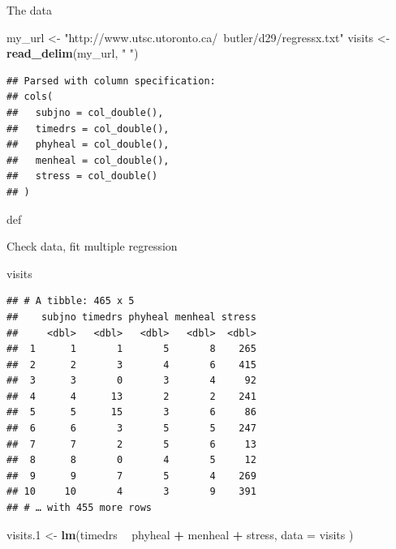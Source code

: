 \documentclass[ignorenonframetext,]{beamer}
\newenvironment{Shaded}{\begin{snugshade}}{\end{snugshade}}
\newcommand{\DataTypeTok}[1]{\textcolor[rgb]{0.13,0.29,0.53}{#1}}
\newcommand{\FloatTok}[1]{\textcolor[rgb]{0.00,0.00,0.81}{#1}}
\newcommand{\KeywordTok}[1]{\textcolor[rgb]{0.13,0.29,0.53}{\textbf{#1}}}
\newcommand{\NormalTok}[1]{#1}
\newcommand{\OperatorTok}[1]{\textcolor[rgb]{0.81,0.36,0.00}{\textbf{#1}}}
\newcommand{\StringTok}[1]{\textcolor[rgb]{0.31,0.60,0.02}{#1}}
\begin{document}
\begin{frame}[fragile]{The data}
\protect\hypertarget{the-data}{}

\begin{Shaded}
\begin{Highlighting}[]
\NormalTok{my_url <-}\StringTok{ "http://www.utsc.utoronto.ca/~butler/d29/regressx.txt"}
\NormalTok{visits <-}\StringTok{ }\KeywordTok{read_delim}\NormalTok{(my_url, }\StringTok{" "}\NormalTok{)}
\end{Highlighting}
\end{Shaded}

\begin{verbatim}
## Parsed with column specification:
## cols(
##   subjno = col_double(),
##   timedrs = col_double(),
##   phyheal = col_double(),
##   menheal = col_double(),
##   stress = col_double()
## )
\end{verbatim}

def

\end{frame}

\begin{frame}[fragile]{Check data, fit multiple regression}
\protect\hypertarget{check-data-fit-multiple-regression}{}

\begin{Shaded}
\begin{Highlighting}[]
\NormalTok{visits}
\end{Highlighting}
\end{Shaded}

\begin{verbatim}
## # A tibble: 465 x 5
##    subjno timedrs phyheal menheal stress
##     <dbl>   <dbl>   <dbl>   <dbl>  <dbl>
##  1      1       1       5       8    265
##  2      2       3       4       6    415
##  3      3       0       3       4     92
##  4      4      13       2       2    241
##  5      5      15       3       6     86
##  6      6       3       5       5    247
##  7      7       2       5       6     13
##  8      8       0       4       5     12
##  9      9       7       5       4    269
## 10     10       4       3       9    391
## # … with 455 more rows
\end{verbatim}

\begin{Shaded}
\begin{Highlighting}[]
\NormalTok{visits}\FloatTok{.1}\NormalTok{ <-}\StringTok{ }\KeywordTok{lm}\NormalTok{(timedrs }\OperatorTok{~}\StringTok{ }\NormalTok{phyheal }\OperatorTok{+}\StringTok{ }\NormalTok{menheal }\OperatorTok{+}\StringTok{ }\NormalTok{stress,}
  \DataTypeTok{data =}\NormalTok{ visits}
\NormalTok{)}
\end{Highlighting}
\end{Shaded}

\end{frame}
\end{document}
